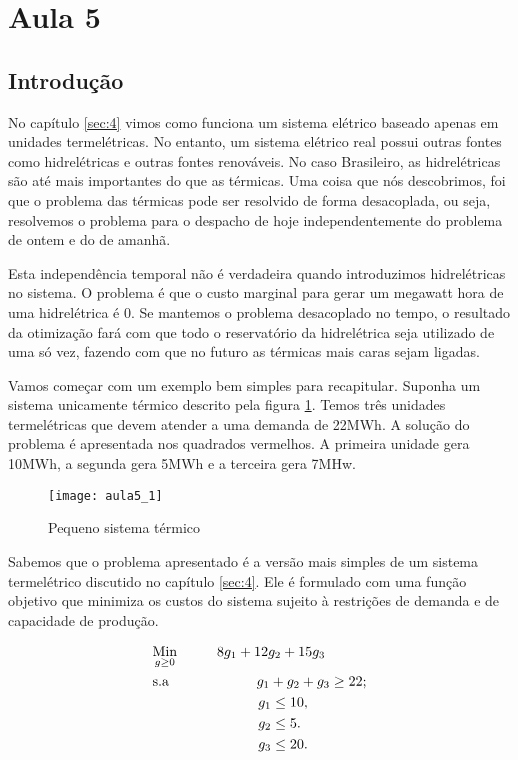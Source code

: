 \section{Aula 5}

\subsection{Introdução}

No capítulo \ref{sec:4} vimos como funciona um sistema elétrico baseado apenas em unidades termelétricas. No entanto, um sistema elétrico real possui outras fontes como hidrelétricas e outras fontes renováveis. No caso Brasileiro, as hidrelétricas são até mais importantes do que as térmicas. Uma coisa que nós descobrimos, foi que o problema das térmicas pode ser resolvido de forma desacoplada, ou seja, resolvemos o problema para o despacho de hoje independentemente do problema de ontem e do de amanhã. 

Esta independência temporal não é verdadeira quando introduzimos hidrelétricas no sistema. O problema é que o custo marginal para gerar um megawatt hora de uma hidrelétrica é 0. Se mantemos o problema desacoplado no tempo, o resultado da otimização fará com que todo o reservatório da hidrelétrica seja utilizado de uma só vez, fazendo com que no futuro as térmicas mais caras sejam ligadas. 

Vamos começar com um exemplo bem simples para recapitular. Suponha um sistema unicamente térmico descrito pela figura \ref{fig:sist5}. Temos três unidades termelétricas que devem atender a uma demanda de 22MWh. A solução do problema é apresentada nos quadrados vermelhos. A primeira unidade gera 10MWh, a segunda gera 5MWh e a terceira gera 7MHw. 

\begin{figure}[H]
\begin{centering}
\texttt{[image: aula5\_1]}\protect\caption{\label{fig:sist5} Pequeno sistema térmico}
\end{centering}
\end{figure}

Sabemos que o problema apresentado é a versão mais simples de um sistema termelétrico discutido no capítulo \ref{sec:4}. Ele é formulado com uma função objetivo que minimiza os custos do sistema sujeito à restrições de demanda e de capacidade de produção. 

\begin{align}
    & \underset{g\geq0}{\text{Min}} \hspace{1cm} 8g_1+12g_2+15g_3  \\
    & \text{s.a}  \hspace{2.2cm} g_1+g_2+g_3 \geq 22;  \\
    &             \hspace{2.65cm} g_1\leq 10, \\
    &             \hspace{2.65cm} g_2\leq 5. \\
    &             \hspace{2.65cm} g_3\leq 20. 
\end{align}

